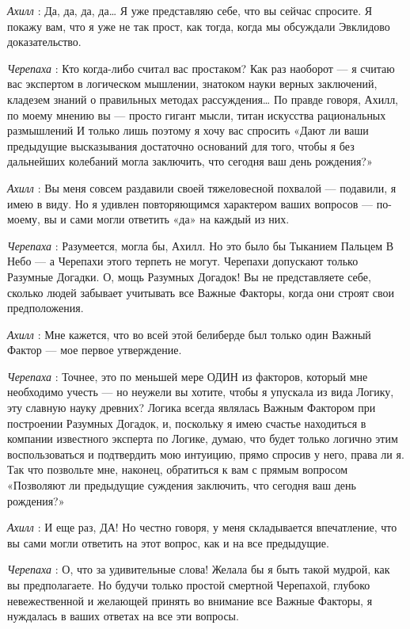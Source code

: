 \emph{Ахилл} : Да, да, да, да\ldots{} Я уже представляю себе, что вы сейчас спросите. Я покажу вам, что я уже не так прост, как тогда, когда мы обсуждали Эвклидово доказательство.

\emph{Черепаха} : Кто когда-либо считал вас простаком? Как раз наоборот --- я считаю вас экспертом в логическом мышлении, знатоком науки верных заключений, кладезем знаний о правильных методах рассуждения\ldots{} По правде говоря, Ахилл, по моему мнению вы --- просто гигант мысли, титан искусства рациональных размышлений И только лишь поэтому я хочу вас спросить «Дают ли ваши предыдущие высказывания достаточно оснований для того, чтобы я без дальнейших колебаний могла заключить, что сегодня ваш день рождения?»

\emph{Ахилл} : Вы меня совсем раздавили своей тяжеловесной похвалой --- подавили, я имею в виду. Но я удивлен повторяющимся характером ваших вопросов --- по-моему, вы и сами могли ответить «да» на каждый из них.

\emph{Черепаха} : Разумеется, могла бы, Ахилл. Но это было бы Тыканием Пальцем В Небо --- а Черепахи этого терпеть не могут. Черепахи допускают только Разумные Догадки. О, мощь Разумных Догадок! Вы не представляете себе, сколько людей забывает учитывать все Важные Факторы, когда они строят свои предположения.

\emph{Ахилл} : Мне кажется, что во всей этой белиберде был только один Важный Фактор --- мое первое утверждение.

\emph{Черепаха} : Точнее, это по меньшей мере ОДИН из факторов, который мне необходимо учесть --- но неужели вы хотите, чтобы я упускала из вида Логику, эту славную науку древних? Логика всегда являлась Важным Фактором при построении Разумных Догадок, и, поскольку я имею счастье находиться в компании известного эксперта по Логике, думаю, что будет только логично этим воспользоваться и подтвердить мою интуицию, прямо спросив у него, права ли я. Так что позвольте мне, наконец, обратиться к вам с прямым вопросом «Позволяют ли предыдущие суждения заключить, что сегодня ваш день рождения?»

\emph{Ахилл} : И еще раз, ДА! Но честно говоря, у меня складывается впечатление, что вы сами могли ответить на этот вопрос, как и на все предыдущие.

\emph{Черепаха} : О, что за удивительные слова! Желала бы я быть такой мудрой, как вы предполагаете. Но будучи только простой смертной Черепахой, глубоко невежественной и желающей принять во внимание все Важные Факторы, я нуждалась в ваших ответах на все эти вопросы.

